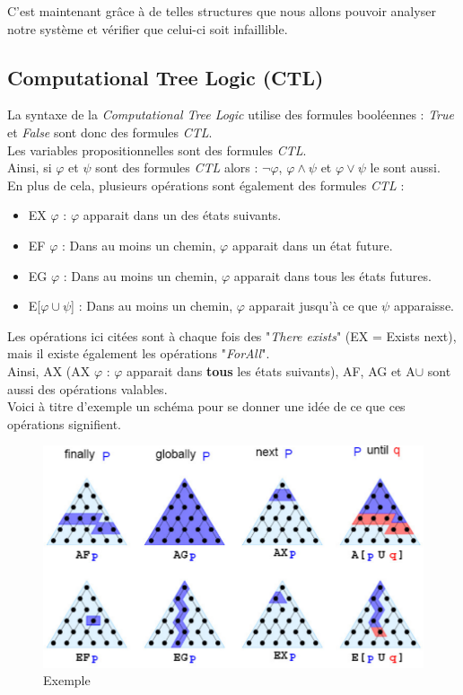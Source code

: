 \documentclass[runningheads,a4paper]{llncs}
\begin{document}
\noindent C'est maintenant grâce à de telles structures que nous allons pouvoir analyser notre système et vérifier que celui-ci soit infaillible.

\subsection{Computational Tree Logic (CTL)}

La syntaxe de la \textit{Computational Tree Logic} utilise des formules booléennes : \textit{True} et \textit{False} sont donc des formules \textit{CTL}.\\
Les variables propositionnelles sont des formules \textit{CTL}.\\
Ainsi, si $\varphi$ et $\psi$ sont des formules \textit{CTL} alors : $\lnot \varphi$, $\varphi \land \psi$ et $\varphi \lor \psi$ le sont aussi.\\

\noindent En plus de cela, plusieurs opérations sont également des formules \textit{CTL} : 

\begin{itemize}
\item EX $\varphi$ : $\varphi$ apparait dans un des états suivants.
\item EF $\varphi$ : Dans au moins un chemin, $\varphi$ apparait dans un état future.
\item EG $\varphi$ : Dans au moins un chemin, $\varphi$ apparait dans tous les états futures.
\item E[$\varphi \cup \psi$] : Dans au moins un chemin, $\varphi$ apparait jusqu'à ce que $\psi$ apparaisse. \\
\end{itemize}


\noindent Les opérations ici citées sont à chaque fois des "\textit{There exists}" (EX = Exists next), mais il existe également les opérations "\textit{ForAll}". \\
Ainsi, AX (AX $\varphi$ : $\varphi$ apparait dans \textbf{tous} les états suivants),
AF, AG et A$\cup$ sont aussi des opérations valables.\\

\noindent Voici à titre d'exemple un schéma pour se donner une idée de ce que ces opérations signifient.

\begin{figure}[!h]
	\includegraphics[scale=0.4]{liveness.png}
	\centering
	\caption{Exemple}
	\label{label-image5}
\end{figure}
\end{document}
